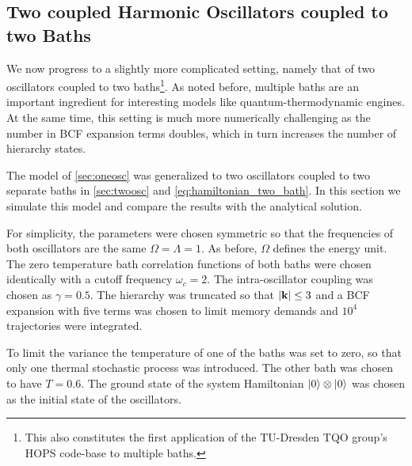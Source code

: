 

\subsection{Two coupled Harmonic Oscillators coupled to two Baths}
\label{sec:twoosccomp}
We now progress to a slightly more complicated setting, namely that of
two oscillators coupled to two baths\footnote{This also constitutes
  the first application of the TU-Dresden TQO group's HOPS code-base
  to multiple baths.}. As noted before, multiple baths are an
important ingredient for interesting models like quantum-thermodynamic
engines. At the same time, this setting is much more numerically
challenging as the number in BCF expansion terms doubles, which in
turn increases the number of hierarchy states.

The model of \cref{sec:oneosc} was generalized to two oscillators
coupled to two separate baths in \cref{sec:twoosc} and
\cref{eq:hamiltonian_two_bath}. In this section we simulate this model
and compare the results with the analytical solution.

For simplicity, the parameters were chosen symmetric so that the
frequencies of both oscillators are the same \(Ω=Λ=1\). As before,
\(Ω\) defines the energy unit. The zero temperature bath correlation
functions of both baths were chosen identically with a cutoff
frequency \(ω_c=2\). The intra-oscillator coupling was chosen as
\(γ=0.5\). The hierarchy was truncated so that \(\abs{\vb{k}}\leq 3\) and a BCF
expansion with five terms was chosen to limit memory demands and
\(10^{4}\) trajectories were integrated.

To limit the variance the temperature of one of the baths was set to
zero, so that only one thermal stochastic process was introduced. The
other bath was chosen to have \(T=0.6\). The ground state of the
system Hamiltonian \(\ket{0}\otimes \ket{0}\) was chosen as the
initial state of the oscillators.

